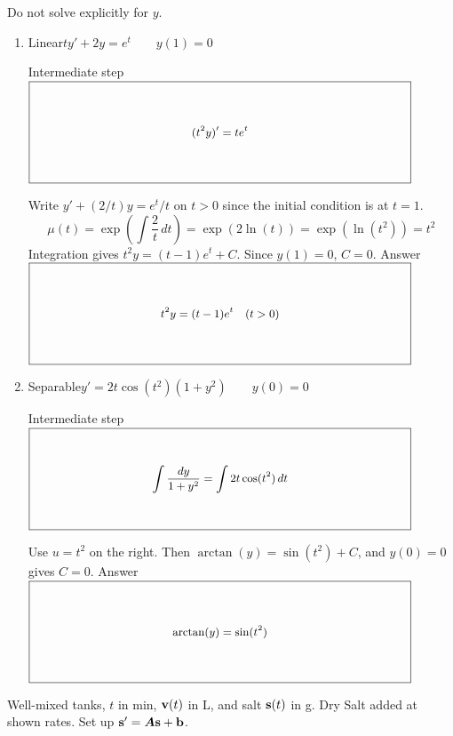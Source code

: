 \documentclass[11pt,letterpaper]{article}
\newcommand{\mat}[1]{\bm{#1}}
\newcommand{\VectorKey}[1]{\KeyBox{4.16in}{1.04in}{#1}}
\newcommand{\KeyBox}[3]{%
  \vcenter{\hbox{$\boxed{\parbox[c][#2][c]{#1}{\centering\small
    \setlength{\arraycolsep}{3pt}\renewcommand{\arraystretch}{0.95}%
    \ensuremath{\displaystyle #3}}}$}}}
\begin{document}
Do not solve explicitly for $y$.
\begin{enumerate}
\item Linear\qquad $ty'+2y=e^t\qquad y(1)=0$
\par Intermediate step\quad $\VectorKey{(t^2y)'=te^t}$
\par{\footnotesize Write $y'+(2/t)y=e^t/t$ on $t>0$ since the initial condition is at $t=1$.
\[
\mu(t)=\exp\!\left(\int \frac{2}{t}\,dt\right)
=\exp(2\ln(t))
=\exp\!\left(\ln(t^2)\right)
=t^2
\]
Integration gives $t^2y=(t-1)e^t+C$. Since $y(1)=0$, $C=0$.}
\vfill
\noindent Answer\quad $\VectorKey{t^2y=(t-1)e^t\quad(t>0)}$
\item Separable\qquad $y'=2t\cos(t^2)(1+y^2)\qquad y(0)=0$
\par Intermediate step\quad $\VectorKey{\int\frac{dy}{1+y^2}=\int 2t\cos(t^2)\,dt}$
\par{\footnotesize Use $u=t^2$ on the right. Then $\arctan(y)=\sin(t^2)+C$, and $y(0)=0$ gives $C=0$.}
\vfill
\noindent Answer\quad $\VectorKey{\arctan(y)=\sin(t^2)}$
\end{enumerate}
\newpage
\noindent{}
\par Well-mixed tanks, $t$ in min, $\mathbf{v}(t)$ in L, and salt $\mathbf{s}(t)$ in g. Dry Salt added at shown rates.
Set up $\vect{s}'=\mat{A}\vect{s}+\vect{b}$.
\end{document}
